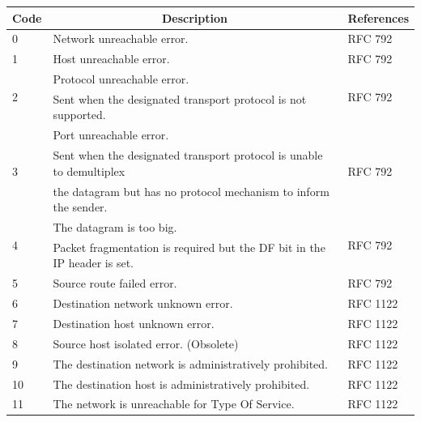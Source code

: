 \begin{table}[H]
\centering \footnotesize
\begin{tabular}{|l|l|l|}
\multicolumn{1}{c}{Code} & \multicolumn{1}{c}{Description} & \multicolumn{1}{c}{References}\\
\hline
\footnotesize{0} & {\footnotesize{Network unreachable error.}} & {\footnotesize{RFC 792}}\\
\hline
\footnotesize{1} & {\footnotesize{Host unreachable error.}} & {\footnotesize{RFC 792}}\\
\hline
\multirow{2}{*}{\footnotesize{2}} &	{\footnotesize{Protocol unreachable error.}} & \multirow{2}{*}{\footnotesize{RFC 792}}\\
& {\footnotesize{Sent when the designated transport protocol is not supported.}} &	\\
\hline
\multirow{3}{*}{\footnotesize{3}} & {\footnotesize{Port unreachable error.}} & \multirow{3}{*}{\footnotesize{RFC 792}}\\
& {\footnotesize{Sent when the designated transport protocol is unable to demultiplex}} &\\
& {\footnotesize{the datagram but has no protocol mechanism to inform the sender.}} &\\
\hline
\multirow{2}{*}{\footnotesize{4}} & {\footnotesize{The datagram is too big.}} & \multirow{2}{*}{\footnotesize{RFC 792}}\\
& {\footnotesize{Packet fragmentation is required but the DF bit in the IP header is set.}} &\\
\hline
\footnotesize{5} & {\footnotesize{Source route failed error.}} & {\footnotesize{RFC 792}}\\
\hline
\footnotesize{6} & {\footnotesize{Destination network unknown error.}} & {\footnotesize{RFC 1122}}\\
\hline
\footnotesize{7} & {\footnotesize{Destination host unknown error.}} & {\footnotesize{RFC 1122}}\\
\hline
\footnotesize{8} & {\footnotesize{Source host isolated error. (Obsolete)}} & {\footnotesize{RFC 1122}}\\
\hline
\footnotesize{9} & {\footnotesize{The destination network is administratively prohibited.}} & {\footnotesize{RFC 1122}}\\
\hline
\footnotesize{10} & {\footnotesize{The destination host is administratively prohibited.}} & {\footnotesize{RFC 1122}}\\
\hline
\footnotesize{11} & {\footnotesize{The network is unreachable for Type Of Service.}} & {\footnotesize{RFC 1122}}\\

\end{tabular}
\end{table}
